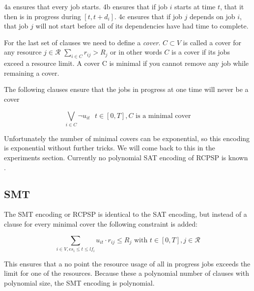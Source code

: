 \documentclass{sig-alternate}
\begin{document}
4a ensures that every job starts.
4b ensures that if job $i$ starts at time $t$, that it then is in progress during $[t,t+d_i]$.
4c ensures that if job $j$ depends on job $i$, that job $j$ will not start before all of its dependencies have had time to complete.

For the last set of clauses we need to define a \emph{cover}.
$C \subset V$ is called a cover for any resource $j \in \mathcal{R}$ $\sum_{i \in C}{r_{ij}} > R_j$ or in other words $C$ is a cover if its jobs exceed a resource limit. A cover C is minimal if you cannot remove any job while remaining a cover.

The following clauses ensure that the jobs in progress at one time will never be a cover

$$\bigvee_{i \in C} \neg u_{it} \text{ } t \in [0,T], C \text{ is a minimal cover}$$

Unfortunately the number of minimal covers can be exponential, so this encoding is exponential without further tricks.
We will come back to this in the experiments section.
Currently no polynomial SAT encoding of RCPSP is known \cite{abdolshah2014review}.

\subsection{SMT}

The SMT encoding or RCPSP is identical to the SAT encoding, but instead of a clause for every minimal cover the following constraint is added:

\[
\sum_{i \in V, {es_i}\leq{t}\leq{lf_i}}{u_{it} \cdot r_{ij} \leq R_j} \text{ with } t \in [0,T], j \in \mathcal{R}
\]

This ensures that a no point the resource usage of all in progress jobs exceeds the limit for one of the resources.
Because these a polynomial number of clauses with polynomial size, the SMT encoding is polynomial.
\end{document}
